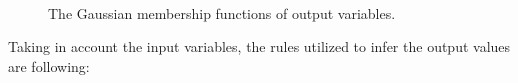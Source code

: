 \begin{figure}[ht!]
   \centering
        \hspace{0.1\linewidth}
    \\
   \caption{The Gaussian membership functions of output variables.
   }
   \label{fig:fis-outputs} 
\end{figure}
Taking in account the input variables, the rules utilized to infer the 
output values are following:
